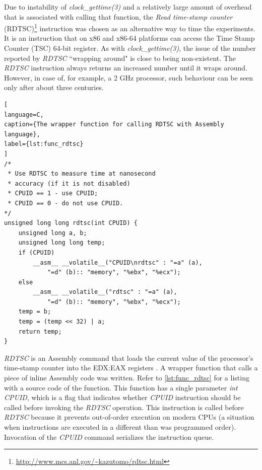 Due to instability of \textit{clock\_gettime(3)} and a relatively large amount of overhead that is associated with calling that function, the \textit{Read time-stamp counter} (RDTSC)\footnote{\url{http://www.mcs.anl.gov/~kazutomo/rdtsc.html}} instruction was chosen as an alternative way to time the experiments. It is an instruction that on x86 and x86-64 platforms can access the Time Stamp Counter (TSC) 64-bit register. As with \textit{clock\_gettime(3)}, the issue of the number reported by \textit{RDTSC} ``wrapping around" is close to being non-existent. The \textit{RDTSC} instruction always returns an increased number until it wraps around. However, in case of, for example, a 2 GHz processor, such behaviour can be seen only after about three centuries.

\begin{lstlisting}[
language=C,
caption={The wrapper function for calling RDTSC with Assembly language},
label={lst:func_rdtsc}
]
/*
 * Use RDTSC to measure time at nanosecond
 * accuracy (if it is not disabled)
 * CPUID == 1 - use CPUID;
 * CPUID == 0 - do not use CPUID.
*/
unsigned long long rdtsc(int CPUID) {
	unsigned long a, b;
	unsigned long long temp;
	if (CPUID)
		__asm__ __volatile__("CPUID\nrdtsc" : "=a" (a),
		    "=d" (b):: "memory", "%ebx", "%ecx");
	else
		__asm__ __volatile__("rdtsc" : "=a" (a),
		    "=d" (b):: "memory", "%ebx", "%ecx");
	temp = b;
	temp = (temp << 32) | a;
	return temp;
}
\end{lstlisting}

\textit{RDTSC} is an Assembly command that loads the current value of the processor's time-stamp counter into the EDX:EAX registers \cite{Faydoc2014}. A wrapper function that calls a piece of inline Assembly code was written. Refer to \ref{lst:func_rdtsc} for a listing with a source code of the function. This function has a single parameter \textit{int CPUID}, which is a flag that indicates whether \textit{CPUID} instruction should be called before invoking the \textit{RDTSC} operation. This instruction is called before \textit{RDTSC} because it prevents out-of-order execution on modern CPUs (a situation when instructions are executed in a different than was programmed order). Invocation of the \textit{CPUID} command serializes the instruction queue. 

